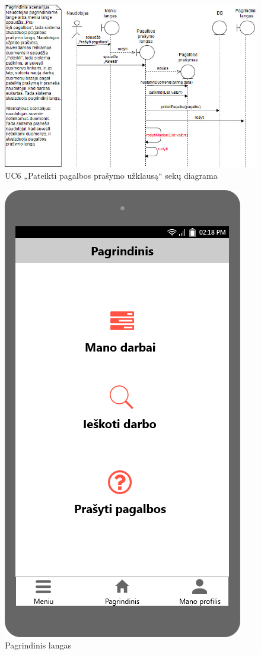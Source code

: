 \documentclass{VUMIFPSbakalaurinis}
\begin{document}
\begin{figure}[H]
	\centering
	\includegraphics[scale=0.6]{img/Sequence/6sequence}
	\caption{UC6 „Pateikti pagalbos prašymo užklausą“ sekų diagrama}
	\label{img:uc6seq}
\end{figure}

\begin{figure}[H]
	\centering
	\includegraphics[scale=0.4]{img/ScreenShots/12-Pagrindinis-langas}
	\caption{Pagrindinis langas}
	\label{img:main}
\end{figure}
\end{document}
